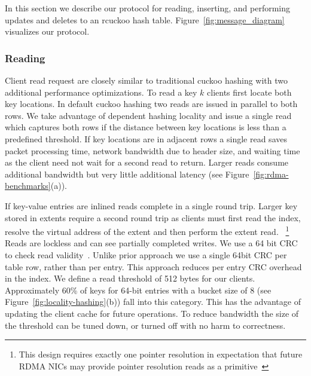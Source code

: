 In this section we describe our protocol for reading,
inserting, and performing updates and deletes to an rcuckoo
hash table. Figure~\ref{fig:message_diagram} visualizes our
protocol.

\subsubsection{Reading} 
\label{sec:reading}

Client read request are closely similar to traditional
cuckoo hashing with two additional performance
optimizations. To read a key $k$ clients first locate both
key locations. In default cuckoo hashing two reads are
issued in parallel to both rows. We take advantage of
dependent hashing locality and issue a single read which
captures both rows if the distance between key locations is
less than a predefined threshold. If key locations are in
adjacent rows a single read saves packet processing time,
network bandwidth due to header size, and waiting time as
the client need not wait for a second read to return. Larger
reads consume additional bandwidth but very little
additional latency (see Figure~\ref{fig:rdma-benchmarks}(a)).

If key-value entries are inlined reads complete in a single
round trip. Larger key stored in extents require a second
round trip as clients must first read the index, resolve the
virtual address of the extent and then perform the extent
read.
~\footnote{This design requires exactly one pointer
resolution in expectation that future RDMA NICs may provide
pointer resolution reads as a primitive~\cite{prism}}
Reads are lockless and can see partially completed writes.
We use a 64 bit CRC to check read
validity~\cite{pilaf,cell}. Unlike prior approach we use a
single 64bit CRC per table row, rather than per entry. This
approach reduces per entry CRC overhead in the index.
We define a read threshold of 512 bytes for our clients.
Approximately 60\% of keys for 64-bit entries with a bucket
size of 8 (see Figure~\ref{fig:locality-hashing}(b)) fall
into this category. This has the advantage of updating the
client cache for future operations.
To reduce bandwidth the size of the threshold can be tuned
down, or turned off with no harm to correctness.


